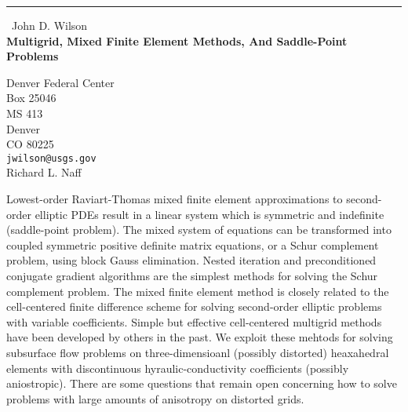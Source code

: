 \documentclass{report}
\begin{document}
\begin{center}
\rule{6in}{1pt} \
{\large John D. Wilson \\
{\bf Multigrid, Mixed Finite Element Methods, And Saddle-Point Problems}}

Denver Federal Center \\ Box 25046 \\ MS 413 \\ Denver \\ CO 80225
\\
{\tt jwilson@usgs.gov}\\
Richard L. Naff\end{center}

Lowest-order Raviart-Thomas mixed finite element approximations to
second-order elliptic PDEs result in a linear system which is symmetric
and indefinite (saddle-point problem). The mixed system of equations can
be transformed into coupled symmetric positive definite matrix equations,
or a Schur complement problem, using block Gauss elimination. Nested
iteration and preconditioned conjugate gradient algorithms are the
simplest methods for solving the Schur complement problem. The mixed
finite element method is closely related to the cell-centered finite
difference scheme for solving second-order elliptic problems with
variable coefficients.
Simple but effective cell-centered multigrid methods have
been developed by others in the past. We exploit these mehtods
for solving subsurface flow problems on three-dimensioanl
(possibly distorted) heaxahedral elements with discontinuous
hyraulic-conductivity coefficients (possibly aniostropic).
There are some questions that remain open concerning
how to solve problems with large amounts of anisotropy on distorted grids.
\end{document}

